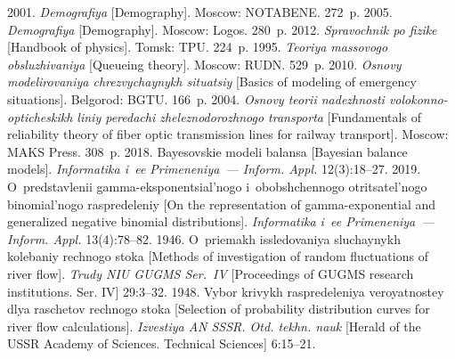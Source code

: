  \begin{multicols}{2}

\renewcommand{\bibname}{\protect\rmfamily References}

{\small\frenchspacing
 {%
 \begin{thebibliography}{99}
 2001. \textit{Demografiya} [Demography]. Moscow: NOTABENE. 272~p.
 2005. \textit{Demografiya} [Demography]. Moscow: Logos. 280~p.
 2012. 
\textit{Spravochnik po fizike} [Handbook of physics]. Tomsk: TPU. 224~p.
 1995. 
\textit{Teoriya massovogo obsluzhivaniya} [Queueing theory]. Moscow: RUDN. 529~p.
2010. \textit{Osnovy modelirovaniya chrezvychaynykh situatsiy} 
[Basics of modeling of emergency situations]. Belgorod: BGTU. 166~p.
2004. \textit{Osnovy teorii nadezhnosti volokonno-opticheskikh liniy peredachi 
zheleznodorozhnogo transporta} [Fundamentals of reliability theory of fiber 
optic transmission lines for railway transport]. Moscow: MAKS Press. 308~p.
 2018. Bayesovskie modeli balansa [Bayesian balance models]. 
 \textit{Informatika i~ee Primeneniya~--- Inform. Appl.} 12(3):18--27.
 2019. O~predstavlenii gamma-eksponentsial'nogo 
i~obobshchennogo otritsatel'nogo binomial'nogo raspredeleniy 
[On the representation of gamma-exponential and generalized negative 
binomial distributions]. \textit{Informatika i~ee Primeneniya~--- 
Inform. Appl.} 13(4):78--82.
 1946. 
O~priemakh issledovaniya sluchaynykh kolebaniy rechnogo stoka 
[Methods of investigation of random fluctuations of river flow]. 
\textit{Trudy NIU GUGMS Ser.~IV} 
[Proceedings of GUGMS research institutions. Ser. IV] 29:3--32.
 1948. Vybor krivykh raspredeleniya veroyatnostey dlya raschetov rechnogo 
 stoka [Selection of probability distribution curves for river flow calculations].
 \textit{Izvestiya AN SSSR. Otd. tekhn. nauk}
  [Herald of the USSR Academy of Sciences. Technical Sciences] 6:15--21.

\end{thebibliography}}}
\end{multicols}
